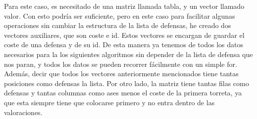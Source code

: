 Para este caso, es necesitado de una matriz llamada tabla, y un vector llamado valor. Con esto podría ser suficiente, pero en este caso para facilitar algunas operaciones sin cambiar la estructura de la lista de defensas, he creado dos vectores auxiliares, que son coste e id. Estos vectores se encargan de guardar el coste de una defensa y de su id. De esta manera ya tenemos de todos los datos necesarios para la los siguientes algoritmos sin depender de la lista de defensa que nos paran, y todos los datos se pueden recorrer fácilmente con un simple for. Además, decir que todos los vectores anteriormente mencionados tiene tantas posiciones como defensas la lista. Por otro lado, la matriz tiene tantas filas como defensas y tantas columnas como ases menos el coste de la primera torreta, ya que esta siempre tiene que colocarse primero y no entra dentro de las valoraciones.